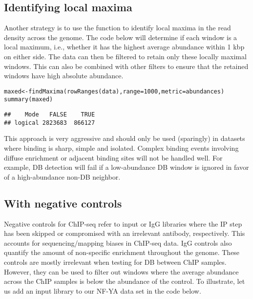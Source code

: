 \documentclass{report}\usepackage[]{graphicx}\usepackage[usenames,dvipsnames]{color}
\newcommand{\hlnum}[1]{\textcolor[rgb]{0.816,0.125,0.439}{#1}}%
\newcommand{\hlstd}[1]{\textcolor[rgb]{0.251,0.251,0.251}{#1}}%
\newcommand{\hlkwb}[1]{\textcolor[rgb]{0,0,0}{#1}}%
\newcommand{\hlkwc}[1]{\textcolor[rgb]{0.251,0.251,0.251}{#1}}%
\newcommand{\hlkwd}[1]{\textcolor[rgb]{0.878,0.439,0.125}{#1}}%
\newenvironment{knitrout}{}{} %
\begin{document}
\subsection{Identifying local maxima}
\label{sec:localmax}
Another strategy is to use the  function to identify local maxima in the read density across the genome.
The code below will determine if each window is a local maximum, i.e., whether it has the highest average abundance within 1 kbp on either side.
The data can then be filtered to retain only these locally maximal windows.
This can also be combined with other filters to ensure that the retained windows have high absolute abundance.

\begin{knitrout}
\color{fgcolor}\begin{kframe}
\begin{alltt}
\hlstd{maxed} \hlkwb{<-} \hlkwd{findMaxima}\hlstd{(}\hlkwd{rowRanges}\hlstd{(data),} \hlkwc{range}\hlstd{=}\hlnum{1000}\hlstd{,} \hlkwc{metric}\hlstd{=abundances)}
\hlkwd{summary}\hlstd{(maxed)}
\end{alltt}
\begin{verbatim}
##    Mode   FALSE    TRUE 
## logical 2823683  866127
\end{verbatim}
\end{kframe}
\end{knitrout}

This approach is very aggressive and should only be used (sparingly) in datasets where binding is sharp, simple and isolated.
Complex binding events involving diffuse enrichment or adjacent binding sites will not be handled well.
For example, DB detection will fail if a low-abundance DB window is ignored in favor of a high-abundance non-DB neighbor.

\subsection{With negative controls}
Negative controls for ChIP-seq refer to input or IgG libraries where the IP step has been skipped or compromised with an irrelevant antibody, respectively. 
This accounts for sequencing/mapping biases in ChIP-seq data. 
IgG controls also quantify the amount of non-specific enrichment throughout the genome. 
These controls are mostly irrelevant when testing for DB between ChIP samples. 
However, they can be used to filter out windows where the average abundance across the ChIP samples is below the abundance of the control. 
To illustrate, let us add an input library to our NF-YA data set in the code below.
\end{document}
